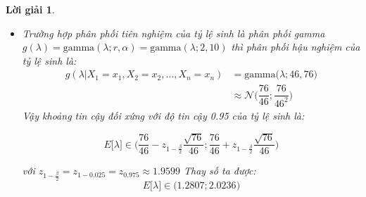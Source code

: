 \documentclass[14pt, a4paper]{article}
\theoremstyle{sltheorem}
\theoremstyle{soltheorem}
\newtheorem*{loigiai}{Lời giải}
\begin{document}
\begin{loigiai}
\begin{enumerate}
\begin{itemize}
\begin{itemize}
\begin{itemize}
                Vậy khoảng tin cậy đối xứng với độ tin cậy 0.95 của tỷ lệ sinh là:

                \begin{equation*}
                    E \lbrack \lambda \rbrack \in \Big( \dfrac{67}{44} - z_{1-\frac{\beta}{2}} \dfrac{\sqrt{67}}{44};\dfrac{67}{44} + z_{1-\frac{\beta}{2}} \dfrac{\sqrt{67}}{44} \Big) 
                \end{equation*}
                
                với $z_{1-\frac{\beta}{2}}=z_{1-0.025}=z_{0.975}\approx1.9599$
                Thay số ta được:
                \begin{equation*}
                    E \lbrack \lambda \rbrack \in \Big( 1.1581; 1.8873 \Big)
                \end{equation*}
                \item Trường hợp phân phối tiên nghiệm của tỷ lệ sinh là phân phối gamma $g(\lambda) = \text{gamma}(\lambda; r, \alpha)=\text{gamma}(\lambda; 2, 10)$ thì phân phối hậu nghiệm của tỷ lệ sinh là:
                \begin{equation*}
                    \begin{aligned}
                        g(\lambda \vert X_1 =x_1, X_2=x_2, \dots, X_n=x_n) &= \text{gamma}\big(\lambda; 46, 76 \big) \\
                        &\approx\mathcal{N}\Big(\dfrac{76}{46};\dfrac{76}{46^2})
                    \end{aligned}
                \end{equation*}
                Vậy khoảng tin cậy đối xứng với độ tin cậy 0.95 của tỷ lệ sinh là:

                \begin{equation*}
                    E \lbrack \lambda \rbrack \in \Big( \dfrac{76}{46} - z_{1-\frac{\beta}{2}} \dfrac{\sqrt{76}}{46};\dfrac{76}{46} + z_{1-\frac{\beta}{2}} \dfrac{\sqrt{76}}{46} \Big) 
                \end{equation*}
                
                với $z_{1-\frac{\beta}{2}}=z_{1-0.025}=z_{0.975}\approx1.9599$
                Thay số ta được:
                \begin{equation*}
                    E \lbrack \lambda \rbrack \in \Big( 1.2807; 2.0236 \Big)
                \end{equation*}

                
                
            \end{itemize}


\end{itemize}
\end{itemize}
\end{enumerate}
\end{loigiai}
\end{document}
